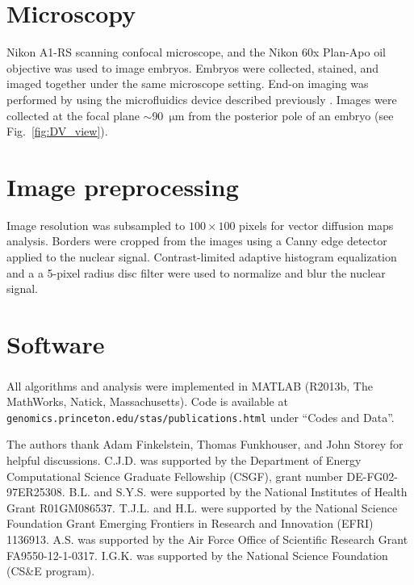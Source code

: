 \documentclass{pnastwo}
\newcommand{\fig}[0]{Fig.}
\begin{document}
\begin{article}
\begin{materials}
\section{Microscopy}
%
Nikon A1-RS scanning confocal microscope, and the Nikon 60x Plan-Apo oil objective was used to image embryos. 
%
Embryos were collected, stained, and imaged together under the same microscope setting. 
%
End-on imaging was performed by using the microfluidics device described previously \cite{chung2010microfluidic}.
%
Images were collected at the focal plane $\sim$90~$\mathrm{\mu m}$ from the posterior pole of an embryo (see \fig~\ref{fig:DV_view}).  

\section{Image preprocessing}
%
Image resolution was subsampled to $100 \times 100$ pixels for vector diffusion maps analysis.
%
Borders were cropped from the images using a Canny edge detector applied to the nuclear signal. 
%
Contrast-limited adaptive histogram equalization and a a 5-pixel radius disc filter were used to normalize and blur the nuclear signal.

\section{Software}
%
All algorithms and analysis were implemented in MATLAB\textsuperscript{\textregistered} (R2013b, The MathWorks, Natick, Massachusetts).
%
Code is available at \texttt{genomics.princeton.edu/stas/publications.html} under ``Codes and Data''. 

\end{materials}




\begin{acknowledgments}
The authors thank Adam Finkelstein,  Thomas Funkhouser, and John Storey for helpful discussions. 
%
C.J.D. was supported by the Department of Energy Computational Science Graduate Fellowship (CSGF), grant number DE-FG02-97ER25308.
%
B.L. and S.Y.S. were supported by the National Institutes of Health Grant R01GM086537. 
%
T.J.L. and H.L. were supported by the National Science Foundation Grant Emerging Frontiers in Research and Innovation (EFRI) 1136913.
%
A.S. was supported by the Air Force Office of Scientific Research Grant
FA9550-12-1-0317.
%
I.G.K. was supported by the National Science Foundation (CS\&E program).
\end{acknowledgments}


\end{article}
\end{document}
